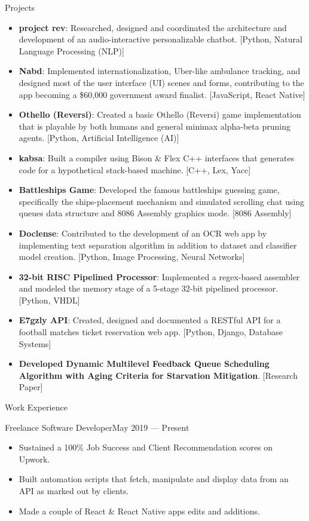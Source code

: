 \documentclass[]{mcdowellcv}
\begin{document}
	\begin{cvsection}{Projects}
		\begin{cvsubsection}{}{}{}
			\begin{itemize}
				\item \textbf{project rev}: Researched, designed and coordinated the architecture and development of an audio-interactive personalizable chatbot. [Python, Natural Language Processing (NLP)]
				\item \textbf{Nabd}: Implemented internationalization, Uber-like ambulance tracking, and designed most of the user interface (UI) scenes and forms, contributing to the app becoming a \$60,000 government award finalist. [JavaScript, React Native]
				\item \textbf{Othello (Reversi)}: Created a basic Othello (Reversi) game implementation that is playable by both humans and general minimax alpha-beta pruning agents. [Python, Artificial Intelligence (AI)]
				\item \textbf{kabsa}: Built a compiler using Bison \& Flex C++ interfaces that generates code for a hypothetical stack-based machine. [C++, Lex, Yacc]
				\item \textbf{Battleships Game}: Developed the famous battleships guessing game, specifically the ships-placement mechanism and simulated scrolling chat using queues data structure and 8086 Assembly graphics mode. [8086 Assembly]
				\item \textbf{Doclense}: Contributed to the development of an OCR web app by implementing text separation algorithm in addition to dataset and classifier model creation. [Python, Image Processing, Neural Networks]
				\item \textbf{32-bit RISC Pipelined Processor}: Implemented a regex-based assembler and modeled the memory stage of a 5-stage 32-bit pipelined processor. [Python, VHDL]
				\item \textbf{E7gzly API}: Created, designed and documented a RESTful API for a football matches ticket reservation web app. [Python, Django, Database Systems]
				\item \textbf{Developed Dynamic Multilevel Feedback Queue Scheduling Algorithm with Aging Criteria for Starvation Mitigation}. [Research Paper]
			\end{itemize}
		\end{cvsubsection}
	\end{cvsection}

	\begin{cvsection}{Work Experience}
		\begin{cvsubsection}{Freelance Software Developer}{}{May 2019 — Present}
			\begin{itemize}
				\item Sustained a 100\% Job Success and Client Recommendation scores on Upwork.
				\item Built automation scripts that fetch, manipulate and display data from an API as marked out by clients.
				\item Made a couple of React \& React Native apps edits and additions.
			\end{itemize}
		\end{cvsubsection}
	\end{cvsection}
	
\end{document}
